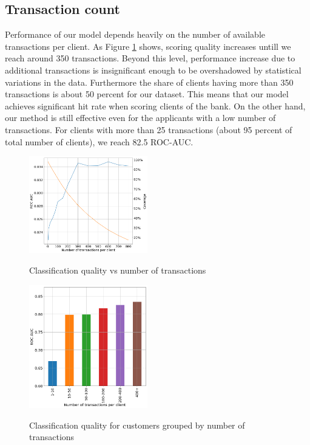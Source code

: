\documentclass[sigconf]{acmart}
\begin{document}
\subsection{Transaction count}

Performance of our model depends heavily on the number of available transactions per client. As Figure \ref{fig-tc} shows, scoring quality increases untill we reach around 350 transactions. Beyond this level, performance increase due to additional transactions is insignificant enough to be overshadowed by statistical variations in the data. Furthermore the share of clients having more than 350 transactions is about 50 percent for our dataset. This means that our model achieves significant hit rate when scoring clients of the bank. On the other hand, our method is still effective even for the applicants with a low number of transactions. For clients with more than 25 transactions (about 95 percent of total number of clients), we reach 82.5 ROC-AUC.

\begin{figure}[ht]
  \caption{Classification quality vs number of transactions}
  \includegraphics[width=0.46\textwidth]{figures/information-vs-accuracy-max.png}
  \label{fig-tc}
\end{figure}

\begin{figure}[ht]
  \caption{Classification quality for customers grouped by number of transactions}
  \includegraphics[width=0.46\textwidth]{figures/information-vs-accuracy-bins.png}
  \label{fig-tcb}
\end{figure}
\end{document}
